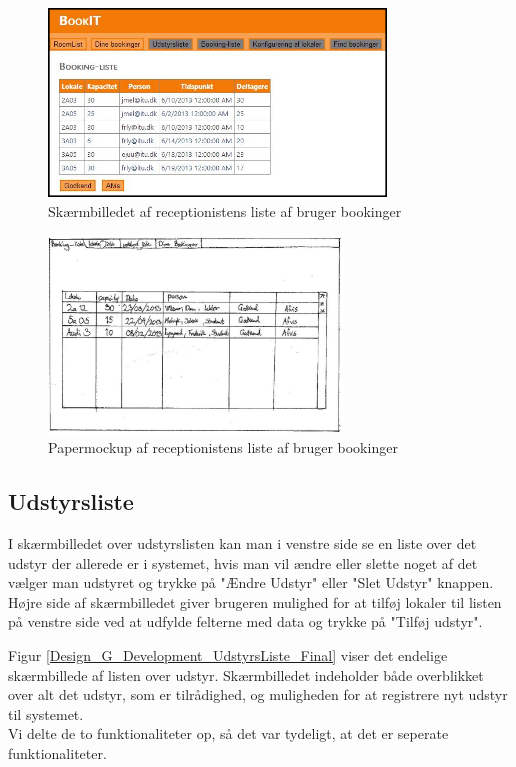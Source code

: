 \begin{figure}[h!]
  \centering
    \includegraphics[width=0.8\textwidth]{Appendix/GUI-Prototype/DigitalMockup/BookingListe}
  \caption{Skærmbilledet af receptionistens liste af bruger bookinger}
\label{Design_G_Development_BookingListe_Final}
\end{figure} 

\begin{figure}[h!]
  \centering
    \includegraphics[width=0.7\textwidth]{Appendix/GUI-Prototype/PaperMockup/GodkendBookinger_001}
  \caption{Papermockup af receptionistens liste af bruger bookinger}
\label{Design_G_Development_BookingListe}
\end{figure} 

\subsection{Udstyrsliste}
I skærmbilledet over udstyrslisten kan man i venstre side se en liste over det udstyr der allerede er i systemet, hvis man vil ændre eller slette noget af det vælger man udstyret og trykke på "Ændre Udstyr" eller "Slet Udstyr" knappen. Højre side af skærmbilledet giver brugeren mulighed for at tilføj lokaler til listen på venstre side ved at udfylde felterne med data og trykke på "Tilføj udstyr".

Figur \ref{Design_G_Development_UdstyrsListe_Final} viser det endelige skærmbillede af listen over udstyr.
Skærmbilledet indeholder både overblikket over alt det udstyr, som er tilrådighed, og muligheden for at registrere nyt udstyr til systemet.
\\Vi delte de to funktionaliteter op, så det var tydeligt, at det er seperate funktionaliteter.

